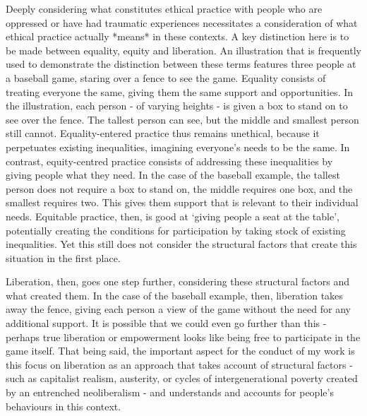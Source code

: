 


 Deeply considering what constitutes ethical practice with people who are oppressed  or have had traumatic experiences necessitates a consideration of what ethical practice actually *means* in these contexts. A key distinction here is to be made between equality, equity and liberation. An illustration that is frequently used to demonstrate the distinction between these terms features three people at a baseball game, staring over a fence to see the game. Equality consists of treating everyone the same, giving them the same support and opportunities. In the illustration, each person - of varying heights - is given a box to stand on to see over the fence. The tallest person can see, but the middle and smallest person still cannot. Equality-entered practice thus remains unethical, because it perpetuates existing inequalities, imagining everyone’s needs to be the same. In contrast, equity-centred practice consists of addressing these inequalities by giving people what they need. In the case of the baseball example, the tallest person does not require a box to stand on, the middle requires one box, and the smallest requires two. This gives them support that is relevant to their individual needs. Equitable practice, then, is good at ‘giving people a seat at the table’, potentially creating the conditions for participation by taking stock of existing inequalities. Yet this still does not consider the structural factors that create this situation in the first place.

Liberation, then, goes one step further, considering these structural factors and what created them. In the case of the baseball example, then, liberation takes away the fence, giving each person a view of the game without the need for any additional support. It is possible that we could even go further than this - perhaps true liberation or empowerment looks like being free to participate in the game itself. That being said, the important aspect for the conduct of my work is this focus on liberation as an approach that takes account of structural factors - such as capitalist realism, austerity, or cycles of intergenerational poverty created by an entrenched neoliberalism - and understands and accounts for people’s behaviours in this context. 

